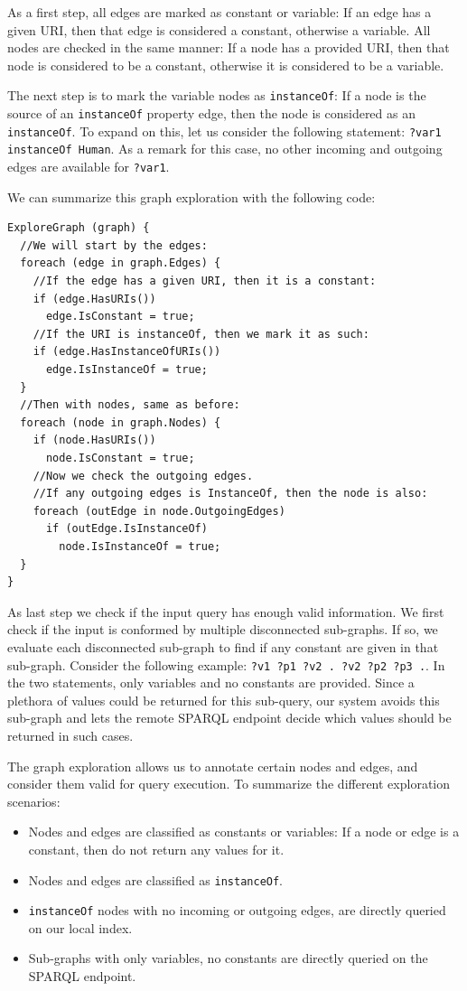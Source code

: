 As a first step, all edges are marked as constant or variable: 
If an edge has a given URI, then that edge is considered a constant, otherwise a variable. 
All nodes are checked in the same manner: If a node has a provided URI, then that node is considered to be a constant, otherwise it is considered to be a variable. 

The next step is to mark the variable nodes as \texttt{instanceOf}:
If a node is the source of an \texttt{instanceOf} property edge, then the node is considered as an \texttt{instanceOf}. To expand on this, let us consider the following statement: \texttt{?var1 instanceOf Human}. As a remark for this case, no other incoming and outgoing edges are available for \texttt{?var1}.

We can summarize this graph exploration with the following code:
\begin{verbatim}
ExploreGraph (graph) {
  //We will start by the edges:
  foreach (edge in graph.Edges) {
    //If the edge has a given URI, then it is a constant:
    if (edge.HasURIs())
      edge.IsConstant = true;
    //If the URI is instanceOf, then we mark it as such:
    if (edge.HasInstanceOfURIs())
      edge.IsInstanceOf = true;
  }
  //Then with nodes, same as before:
  foreach (node in graph.Nodes) {
    if (node.HasURIs())
      node.IsConstant = true;
    //Now we check the outgoing edges.
    //If any outgoing edges is InstanceOf, then the node is also:
    foreach (outEdge in node.OutgoingEdges)
      if (outEdge.IsInstanceOf)
        node.IsInstanceOf = true;
  }
}
\end{verbatim}

As last step we check if the input query has enough valid information. We first check if the input is conformed by multiple disconnected sub-graphs. If so, we evaluate each disconnected sub-graph to find if any constant are given in that sub-graph. Consider the following example: \texttt{?v1 ?p1 ?v2 . ?v2 ?p2 ?p3 .}. 
In the two statements, only variables and no constants are provided.
Since a plethora of values could be returned for this sub-query, our system avoids this sub-graph and lets the remote SPARQL endpoint decide which values should be returned in such cases.

The graph exploration allows us to annotate certain nodes and edges, and consider them valid for query execution. To summarize the different exploration scenarios:
\begin{itemize}
    \item Nodes and edges are classified as constants or variables: If a node or edge is a constant, then do not return any values for it.
    \item Nodes and edges are classified as \texttt{instanceOf}.
    \item \texttt{instanceOf} nodes with no incoming or outgoing edges, are directly queried on our local index.
    \item Sub-graphs with only variables, no constants are directly queried on the SPARQL endpoint.
\end{itemize}

